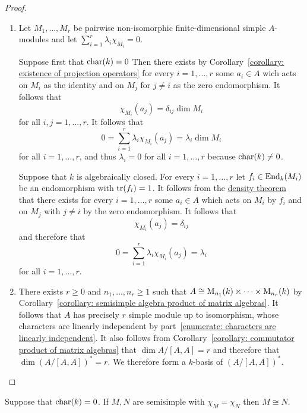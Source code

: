 \begin{proof}
  \leavevmode
  \begin{enumerate}
    \item
      Let $M_1, \dotsc, M_r$ be pairwise non-isomorphic finite-dimensional simple $A$-modules and let $\sum_{i=1}^r \lambda_i \chi_{M_i} = 0$.
      
      Suppose first that $\operatorname{char}(k) = 0$
      Then there exists by Corollary~\ref{corollary: existence of projection operators} for every $i = 1, \dotsc, r$ some $a_i \in A$ wich acts on $M_i$ as the identity and on $M_j$ for $j \neq i$ as the zero endomorphism.
      It follows that
      \[
          \chi_{M_i}(a_j)
        = \delta_{ij} \dim M_i
      \]
      for all $i, j = 1, \dotsc, r$.
      It follows that
      \[
          0
        = \sum_{i=1}^r \lambda_i \chi_{M_i}(a_j)
        = \lambda_i \dim M_i
      \]
      for all $i = 1, \dotsc, r$, and thus $\lambda_i = 0$ for all $i = 1, \dotsc, r$ because $\operatorname{char}(k) \neq 0$.
      
      Suppose that $k$ is algebraically closed.
      For every $i = 1, \dotsc, r$ let $f_i \in \operatorname{End}_k(M_i)$ be an endomorphism with $\operatorname{tr}(f_i) = 1$.
      It follows from the \hyperref[theorem: density theorem]{density theorem} that there exists for every $i = 1, \dotsc, r$ some $a_i \in A$ which acts on $M_i$ by $f_i$ and on $M_j$ with $j \neq i$ by the zero endomorphism.
      It follows that
      \[
          \chi_{M_i}(a_j)
        = \delta_{ij}
      \]
      and therefore that
      \[
          0
        = \sum_{i=1}^r \lambda_i \chi_{M_i}(a_j)
        = \lambda_i
      \]
      for all $i = 1, \dotsc, r$.
    \item
      There exists $r \geq 0$ and $n_1, \dotsc, n_r \geq 1$ such that $A \cong \operatorname{M}_{n_1}(k) \times \dotsb \times \operatorname{M}_{n_r}(k)$ by Corollary~\ref{corollary: semisimple algebra product of matrix algebras}.
      It follows that $A$ has precisely $r$ simple module up to isomorphism, whose characters are linearly independent by part~\ref*{enumerate: characters are linearly independent}.
      It also follows from Corollary~\ref{corollary: commutator product of matrix algebras} that $\dim A/[A,A] = r$ and therefore that $\dim (A/[A,A])^* = r$.
      We therefore form a $k$-basis of $(A/[A,A])^*$.
    \qedhere
  \end{enumerate}
\end{proof}


\begin{corollary}
  Suppose that $\operatorname{char}(k) = 0$.
  If $M, N$ are semisimple with $\chi_M = \chi_N$ then $M \cong N$.
\end{corollary}


